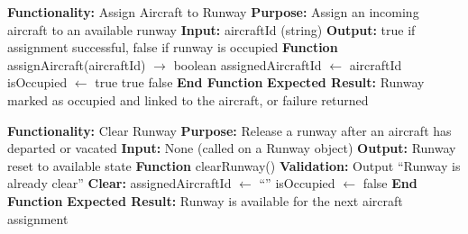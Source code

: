 \documentclass[a4paper,11pt]{article}
\begin{document}
\begin{algorithm}
\caption{Assign Aircraft to Runway}
\begin{algorithmic}[1]
\State \textbf{Functionality:} Assign Aircraft to Runway
\State \textbf{Purpose:} Assign an incoming aircraft to an available runway
\State \textbf{Input:} aircraftId (string)
\State \textbf{Output:} true if assignment successful, false if runway is occupied
\vspace{0.3cm}
\State \textbf{Function} assignAircraft(aircraftId) $\rightarrow$ boolean
\State \hspace{1cm} 
\State \hspace{1.5cm} assignedAircraftId $\leftarrow$ aircraftId
\State \hspace{1.5cm} isOccupied $\leftarrow$ true
\State \hspace{1.5cm} \Return true
\State \hspace{1cm} \Else
\State \hspace{1.5cm} \Return false
\State \hspace{1cm} \EndIf
\State \textbf{End Function}
\State \textbf{Expected Result:} Runway marked as occupied and linked to the aircraft, or failure returned
\end{algorithmic}
\end{algorithm}

\begin{algorithm}
\caption{Clear Runway}
\begin{algorithmic}[1]
\State \textbf{Functionality:} Clear Runway
\State \textbf{Purpose:} Release a runway after an aircraft has departed or vacated
\State \textbf{Input:} None (called on a Runway object)
\State \textbf{Output:} Runway reset to available state
\vspace{0.3cm}
\State \textbf{Function} clearRunway()
\State \hspace{1cm} \textbf{Validation:}
\State \hspace{1.5cm} 
\State \hspace{2cm} Output ``Runway is already clear''
\State \hspace{2cm} \Return
\State \hspace{1.5cm} \EndIf
\State \hspace{1cm} \textbf{Clear:}
\State \hspace{1.5cm} assignedAircraftId $\leftarrow$ ``''
\State \hspace{1.5cm} isOccupied $\leftarrow$ false
\State \textbf{End Function}
\State \textbf{Expected Result:} Runway is available for the next aircraft assignment
\end{algorithmic}
\end{algorithm}
\end{document}
